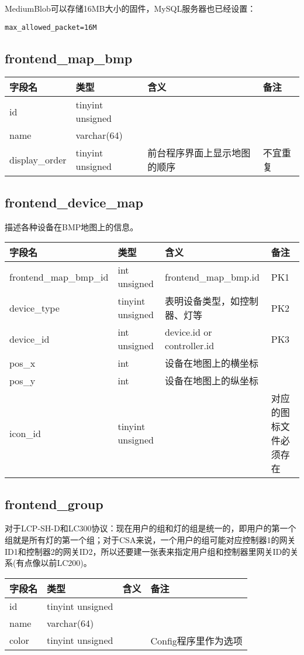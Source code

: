 MediumBlob可以存储16MB大小的固件，MySQL服务器也已经设置：

\texttt{max\_allowed\_packet=16M}

\subsection{frontend\_map\_bmp}\label{frontendux5fmapux5fbmp}

\begin{longtabu}[c]{@{}lXXX@{}}
\toprule
字段名 & 类型 & 含义 & 备注\tabularnewline
\midrule
\endhead
id & tinyint unsigned & &\tabularnewline
name & varchar(64) & &\tabularnewline
display\_order & tinyint unsigned & 前台程序界面上显示地图的顺序 &
不宜重复\tabularnewline
\bottomrule
\end{longtabu}

\subsection{frontend\_device\_map}\label{frontendux5fdeviceux5fmap}

描述各种设备在BMP地图上的信息。

\begin{longtabu}[c]{@{}lXXX@{}}
\toprule
字段名 & 类型 & 含义 & 备注\tabularnewline
\midrule
\endhead
frontend\_map\_bmp\_id & int unsigned & frontend\_map\_bmp.id &
PK1\tabularnewline
device\_type & tinyint unsigned & 表明设备类型，如控制器、灯等 &
PK2\tabularnewline
device\_id & int unsigned & device.id or controller.id &
PK3\tabularnewline
pos\_x & int & 设备在地图上的横坐标 &\tabularnewline
pos\_y & int & 设备在地图上的纵坐标 &\tabularnewline
icon\_id & tinyint unsigned & & 对应的图标文件必须存在\tabularnewline
\bottomrule
\end{longtabu}

\subsection{frontend\_group}\label{frontendux5fgroup}

对于LCP-SH-D和LC300协议：现在用户的组和灯的组是统一的，即用户的第一个组就是所有灯的第一个组；对于CSA来说，一个用户的组可能对应控制器1的网关ID1和控制器2的网关ID2，所以还要建一张表来指定用户组和控制器里网关ID的关系(有点像以前LC200)。

\begin{longtabu}[c]{@{}lXXX@{}}
\toprule
字段名 & 类型 & 含义 & 备注\tabularnewline
\midrule
\endhead
id & tinyint unsigned & &\tabularnewline
name & varchar(64) & &\tabularnewline
color & tinyint unsigned & & Config程序里作为选项\tabularnewline
\bottomrule
\end{longtabu}

